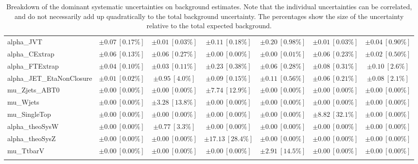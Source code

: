 \begin{sidewaystable}
\begin{center}
\begin{tabular*}{\textwidth}{@{\extracolsep{\fill}}lcccccc}
alpha\_JVT         & $\pm 0.07\ [0.17\%] $          & $\pm 0.01\ [0.03\%] $          & $\pm 0.11\ [0.18\%] $          & $\pm 0.20\ [0.98\%] $          & $\pm 0.01\ [0.03\%] $          & $\pm 0.04\ [0.90\%] $       \\
alpha\_CExtrap         & $\pm 0.06\ [0.13\%] $          & $\pm 0.06\ [0.27\%] $          & $\pm 0.00\ [0.00\%] $          & $\pm 0.00\ [0.01\%] $          & $\pm 0.06\ [0.23\%] $          & $\pm 0.02\ [0.50\%] $       \\
alpha\_FTExtrap         & $\pm 0.04\ [0.10\%] $          & $\pm 0.03\ [0.11\%] $          & $\pm 0.23\ [0.38\%] $          & $\pm 0.06\ [0.28\%] $          & $\pm 0.08\ [0.31\%] $          & $\pm 0.10\ [2.6\%] $       \\
alpha\_JET\_EtaNonClosure         & $\pm 0.01\ [0.02\%] $          & $\pm 0.95\ [4.0\%] $          & $\pm 0.09\ [0.15\%] $          & $\pm 0.11\ [0.56\%] $          & $\pm 0.06\ [0.21\%] $          & $\pm 0.08\ [2.1\%] $       \\
mu\_Zjets\_ABT0         & $\pm 0.00\ [0.00\%] $          & $\pm 0.00\ [0.00\%] $          & $\pm 7.74\ [12.9\%] $          & $\pm 0.00\ [0.00\%] $          & $\pm 0.00\ [0.00\%] $          & $\pm 0.00\ [0.00\%] $       \\
mu\_Wjets         & $\pm 0.00\ [0.00\%] $          & $\pm 3.28\ [13.8\%] $          & $\pm 0.00\ [0.00\%] $          & $\pm 0.00\ [0.00\%] $          & $\pm 0.00\ [0.00\%] $          & $\pm 0.00\ [0.00\%] $       \\
mu\_SingleTop         & $\pm 0.00\ [0.00\%] $          & $\pm 0.00\ [0.00\%] $          & $\pm 0.00\ [0.00\%] $          & $\pm 0.00\ [0.00\%] $          & $\pm 8.82\ [32.1\%] $          & $\pm 0.00\ [0.00\%] $       \\
alpha\_theoSysW         & $\pm 0.00\ [0.00\%] $          & $\pm 0.77\ [3.3\%] $          & $\pm 0.00\ [0.00\%] $          & $\pm 0.00\ [0.00\%] $          & $\pm 0.00\ [0.00\%] $          & $\pm 0.00\ [0.00\%] $       \\
alpha\_theoSysZ         & $\pm 0.00\ [0.00\%] $          & $\pm 0.00\ [0.00\%] $          & $\pm 17.13\ [28.4\%] $          & $\pm 0.00\ [0.00\%] $          & $\pm 0.00\ [0.00\%] $          & $\pm 0.00\ [0.00\%] $       \\
mu\_TtbarV         & $\pm 0.00\ [0.00\%] $          & $\pm 0.00\ [0.00\%] $          & $\pm 0.00\ [0.00\%] $          & $\pm 2.91\ [14.5\%] $          & $\pm 0.00\ [0.00\%] $          & $\pm 0.00\ [0.00\%] $       \\
\noalign{\smallskip}\hline\noalign{\smallskip}
\end{tabular*}
\end{center}
\caption[Breakdown of uncertainty on background estimates]{
Breakdown of the dominant systematic uncertainties on background estimates.
Note that the individual uncertainties can be correlated, and do not necessarily add up quadratically to 
the total background uncertainty. The percentages show the size of the uncertainty relative to the total expected background.
\label{table.results.bkgestimate.uncertainties.SRB_T0_bybkg}}
\end{sidewaystable}
%
